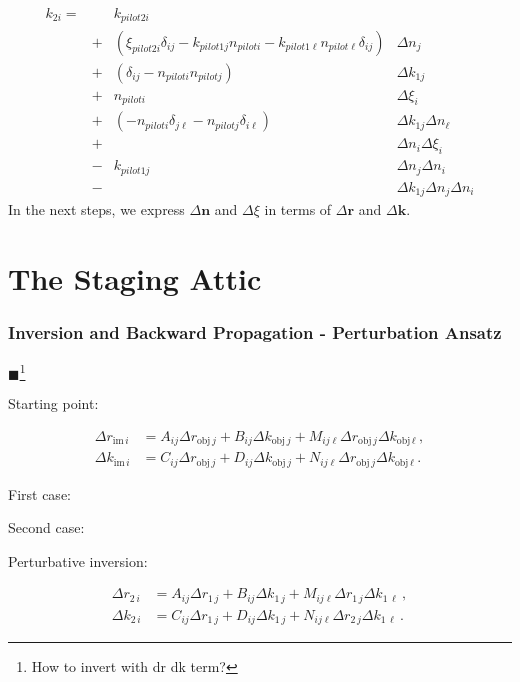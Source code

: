 \documentclass[12pt,a4paper,twoside,openright,BCOR10mm,headsepline,titlepage,abstracton,chapterprefix,final]{scrreprt}
\newcommand\Vector[1]{{\mathbf{#1}}}
\newcommand\wavenumber{k}
\newcommand\Wavevector{\Vector{\wavenumber}}
\newcommand{\remark}[1]{{\color{red}$\blacksquare$}\footnote{{\color{red}#1}}}
\begin{document}
\begin{align}
 \wavenumber_{2i} =&& \wavenumber_{pilot 2i} \nonumber \\
 &+& (\xi_{pilot 2i} \delta_{ij} - \wavenumber_{pilot1j}    n_{piloti} - \wavenumber_{pilot1\ell}   n_{pilot\ell} \delta_{ij}) &\Delta n_j \nonumber\\
 &+& (\delta_{ij} -  n_{piloti} n_{pilotj}) &\Delta \wavenumber_{1j}\nonumber\\
 &+& n_{pilot i} &\Delta \xi_i \nonumber\\
 &+& ( - n_{piloti} \delta_{j\ell} - n_{pilotj} \delta_{i\ell}) &\Delta \wavenumber_{1j} \Delta n_\ell\nonumber\\
 &+& &\Delta n_i \Delta \xi_i \nonumber\\
 &-& \wavenumber_{pilot1j}  & \Delta n_j \Delta n_i \nonumber\\
 &-& &\Delta \wavenumber_{1j} \Delta n_j \Delta n_i
\end{align}
In the next steps, we express $\Delta \Vector{n}$ and $\Delta \xi$ in terms of $\Delta \Vector{r}$ and $\Delta \Wavevector$.


\chapter{The Staging Attic}

\subsection{Inversion and Backward Propagation - Perturbation Ansatz}

\remark{How to invert with dr dk term?}

\newcommand{\dr}[2]{\Delta {r}_{#1\,#2}}
\newcommand{\dk}[2]{\Delta {k}_{#1\,#2}}

Starting point:

\begin{eqnarray}
 \dr{\text{im}}{i} & = A_{ij} \dr{\text{obj}}{j} + B_{ij} \dk{\text{obj}}{j} + M_{ij\ell} \dr{\text{obj}}{j} \dk{\text{obj}}{\ell}\,,\\
 \dk{\text{im}}{i} & = C_{ij} \dr{\text{obj}}{j} + D_{ij} \dk{\text{obj}}{j} + N_{ij\ell} \dr{\text{obj}}{j} \dk{\text{obj}}{\ell}\,.
\end{eqnarray}

First case:

Second case:

Perturbative inversion:

\begin{eqnarray}
 \dr{2}{i} & = A_{ij} \dr{1}{j} + B_{ij} \dk{1}{j} + M_{ij\ell} \dr{1}{j} \dk{1}{\ell}\,,\\
 \dk{2}{i} & = C_{ij} \dr{1}{j} + D_{ij} \dk{1}{j} + N_{ij\ell} \dr{2}{j} \dk{1}{\ell}\,.
\end{eqnarray}
\end{document}
